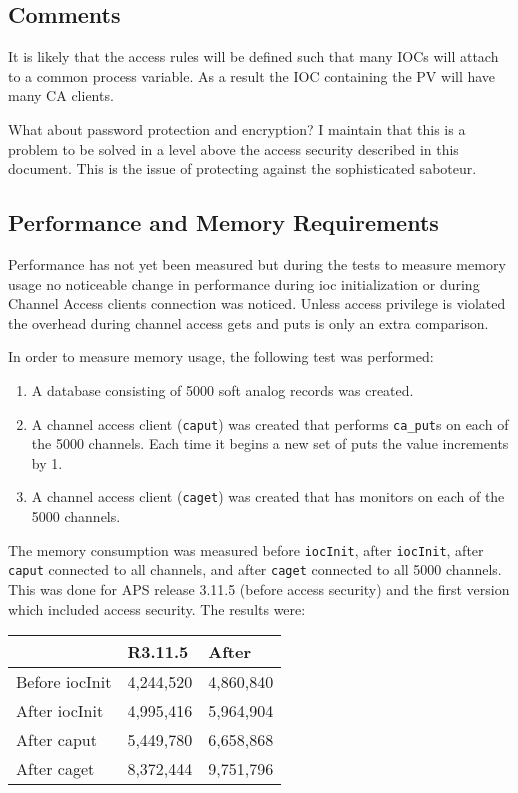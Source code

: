 \subsection{Comments}

It is likely that the access rules will be defined such that many IOCs will attach to a common process variable. As a result 
the IOC containing the PV will have many CA clients.

What about password protection and encryption? I maintain that this is a problem to be solved in a level above the access 
security described in this document. This is the issue of protecting against the sophisticated saboteur.

\subsection{Performance and Memory Requirements}

Performance has not yet been measured but during the tests to measure memory usage no noticeable change in 
performance during ioc initialization or during Channel Access clients connection was noticed. Unless access privilege is 
violated the overhead during channel access gets and puts is only an extra comparison.

In order to measure memory usage, the following test was performed:

\begin{enumerate}\item A database consisting of 5000 soft analog records was created.

\item A channel access client (\verb|caput|) was created that performs \verb|ca_put|s on each of the 5000 channels. Each time it 
begins a new set of puts the value increments by 1.

\item A channel access client (\verb|caget|) was created that has monitors on each of the 5000 channels.

\end{enumerate}The memory consumption was measured before \verb|iocInit|, after \verb|iocInit|, after \verb|caput| connected to all channels, and 
after \verb|caget| connected to all 5000 channels. This was done for APS release 3.11.5 (before access security) and the first 
version which included access security. The results were:
\begin{center}\begin{longtable}{p{1.0in}p{1.0in}p{1.0in}}
 & R3.11.5 & After\\
\hline
Before iocInit & 4,244,520 & 4,860,840\\
After iocInit & 4,995,416 & 5,964,904\\
After caput & 5,449,780 & 6,658,868\\
After caget & 8,372,444 & 9,751,796
\end{longtable}\end{center}


